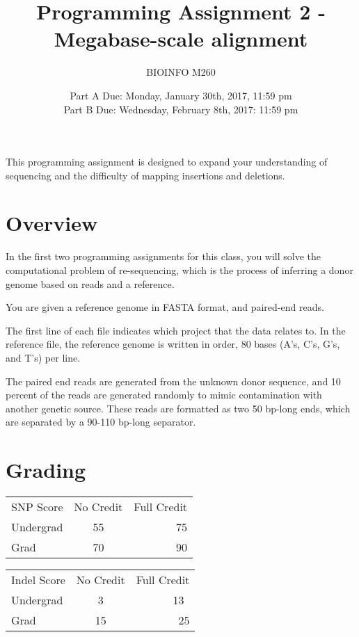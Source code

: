 \documentclass{article}
\begin{document}
\title{Programming Assignment 2 - Megabase-scale alignment}

\author{BIOINFO M260}

\date{Part A Due: Monday, January 30th, 2017, 11:59 pm \\ Part B Due: Wednesday, February 8th, 2017: 11:59 pm}

\maketitle

This programming assignment is designed to expand your understanding of sequencing and the difficulty of mapping insertions and deletions.

\section*{Overview}
In the first two programming assignments for this class, you will solve the computational problem of re-sequencing, which is the process of inferring a donor genome based on reads and a reference. 

You are given a reference genome in FASTA format, and paired-end reads.

The first line of each file indicates which project that the data relates to. In the reference file, the reference genome is written in order, 80 bases (A's, C's, G's, and T's) per line.

The paired end reads are generated from the unknown donor sequence, and 10 percent of the reads are generated randomly to mimic contamination with another genetic source. These reads are formatted as two 50 bp-long ends, which are separated by a 90-110 bp-long separator. 



\section*{Grading}

\begin{tabular}{ l c r }
  SNP Score & No Credit & Full Credit \\
  Undergrad & 55 & 75 \\
  Grad & 70 & 90 \\
\end{tabular}

\vspace{3cm}

\begin{tabular}{ l c r }
  Indel Score & No Credit & Full Credit \\
  Undergrad & 3 & 13\ \\
  Grad & 15 & 25 \\
\end{tabular}
\end{document}
